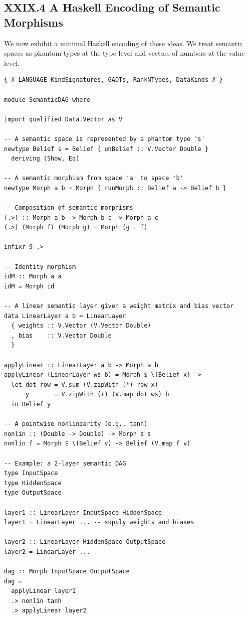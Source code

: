 \documentclass[11pt,letterpaper]{article}
\begin{document}
\subsection{XXIX.4 A Haskell Encoding of Semantic Morphisms}

We now exhibit a minimal Haskell encoding of these ideas. We treat semantic spaces as phantom types at the type level and vectors of numbers at the value level.

\begin{verbatim}
{-# LANGUAGE KindSignatures, GADTs, RankNTypes, DataKinds #-}

module SemanticDAG where

import qualified Data.Vector as V

-- A semantic space is represented by a phantom type 's'
newtype Belief s = Belief { unBelief :: V.Vector Double }
  deriving (Show, Eq)

-- A semantic morphism from space 'a' to space 'b'
newtype Morph a b = Morph { runMorph :: Belief a -> Belief b }

-- Composition of semantic morphisms
(.>) :: Morph a b -> Morph b c -> Morph a c
(.>) (Morph f) (Morph g) = Morph (g . f)

infixr 9 .>

-- Identity morphism
idM :: Morph a a
idM = Morph id

-- A linear semantic layer given a weight matrix and bias vector
data LinearLayer a b = LinearLayer
  { weights :: V.Vector (V.Vector Double)
  , bias    :: V.Vector Double
  }

applyLinear :: LinearLayer a b -> Morph a b
applyLinear (LinearLayer ws b) = Morph $ \(Belief x) ->
  let dot row = V.sum (V.zipWith (*) row x)
      y       = V.zipWith (+) (V.map dot ws) b
  in Belief y

-- A pointwise nonlinearity (e.g., tanh)
nonlin :: (Double -> Double) -> Morph s s
nonlin f = Morph $ \(Belief v) -> Belief (V.map f v)

-- Example: a 2-layer semantic DAG
type InputSpace
type HiddenSpace
type OutputSpace

layer1 :: LinearLayer InputSpace HiddenSpace
layer1 = LinearLayer ... -- supply weights and biases

layer2 :: LinearLayer HiddenSpace OutputSpace
layer2 = LinearLayer ...

dag :: Morph InputSpace OutputSpace
dag =
  applyLinear layer1
  .> nonlin tanh
  .> applyLinear layer2
\end{verbatim}
\end{document}

